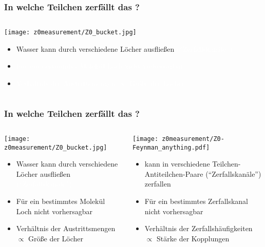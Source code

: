 \begin{frame}[t]
  \frametitle{In welche Teilchen zerf\"allt das \znull?}
  \vskip-0.4cm
  \begin{columns}[T]
    \begin{column}{0.5\textwidth}
      \centering
      \texttt{[image: z0measurement/Z0\_bucket.jpg]}
      \vskip0.1cm
      \begin{itemize}
      \item Wasser kann durch verschiedene L\"ocher ausflie\ss{}en
        \textcolor{white}{(``Zerfallskan\"ale'')}
      \item[~] \textcolor{white}{ F\"ur ein bestimmtes Molek\"ul Loch nicht vorhersagbar}
      \item[~] \textcolor{white}{ Verh\"altnis der Austrittsmengen $\propto$ Gr\"o\ss{}e der
          L\"ocher}
      \end{itemize}
    \end{column}
    \begin{column}{0.5\textwidth}
    \end{column}
  \end{columns}
\end{frame}

\begin{frame}[t]
  \frametitle{In welche Teilchen zerf\"allt das \znull?}
  \vskip-0.4cm
  \begin{columns}[T]
    \begin{column}{0.5\textwidth}
      \centering
      \texttt{[image: z0measurement/Z0\_bucket.jpg]}
      \vskip0.1cm
      \begin{itemize}
      \item<1-> Wasser kann durch verschiedene L\"ocher ausflie\ss{}en \textcolor{white}{(``Zerfallskan\"ale'')}
      \item<2-> F\"ur ein bestimmtes Molek\"ul Loch nicht vorhersagbar
      \item<3-> Verh\"altnis der Austrittsmengen $\propto$ Gr\"o\ss{}e der
        L\"ocher
      \end{itemize}
    \end{column}
    \begin{column}{0.5\textwidth}
      \centering
      \texttt{[image: z0measurement/Z0-Feynman\_anything.pdf]}
      \begin{itemize}
      \item<1-> \znull kann in verschiedene Teilchen-Antiteilchen-Paare (``Zerfallskan\"ale'')
        zerfallen
      \item<2-> F\"ur ein bestimmtes \znull Zerfallskanal nicht vorhersagbar
      \item<3-> Verh\"altnis der Zerfallsh\"aufigkeiten $\propto$ St\"arke der Kopplungen
      \end{itemize}
    \end{column}
  \end{columns}
\end{frame}

